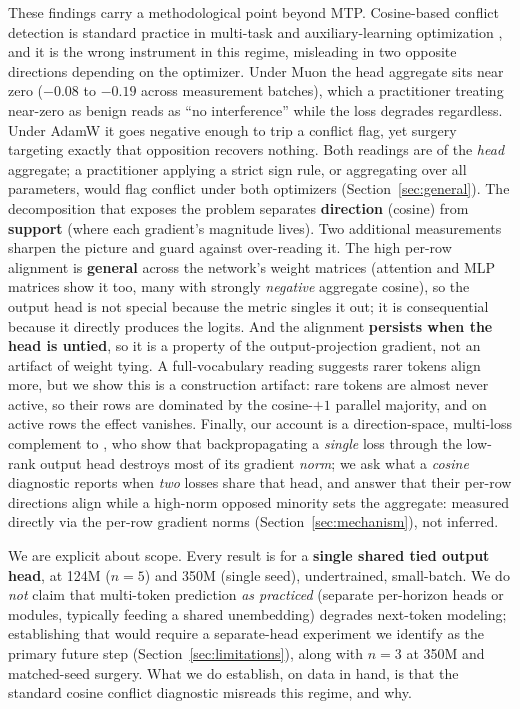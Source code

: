 These findings carry a methodological point beyond MTP. Cosine-based conflict
detection is standard practice in multi-task and auxiliary-learning optimization
\citep{yu2020pcgrad,wang2021gradvaccine,du2018auxsim}, and it is the wrong
instrument in this regime, misleading in two opposite directions depending on the
optimizer. Under Muon the head aggregate sits near zero (${-}0.08$ to ${-}0.19$
across measurement batches), which a practitioner treating near-zero as benign reads
as ``no interference'' while the loss degrades regardless. Under AdamW it goes
negative enough to trip a conflict flag, yet surgery targeting exactly that
opposition recovers nothing. Both readings are of the \emph{head} aggregate; a
practitioner applying a strict sign rule, or aggregating over all parameters, would
flag conflict under both optimizers (Section~\ref{sec:general}). The
decomposition that exposes the problem separates \textbf{direction} (cosine) from
\textbf{support} (where each gradient's magnitude lives). Two additional
measurements sharpen the picture and guard against over-reading it. The high
per-row alignment is \textbf{general} across the network's weight matrices (attention and MLP matrices show it too, many with strongly \emph{negative}
aggregate cosine), so the output head is not special because the metric singles
it out; it is consequential because it directly produces the logits. And the
alignment \textbf{persists when the head is untied}, so it is a property of the
output-projection gradient, not an artifact of weight tying. A full-vocabulary
reading suggests rarer tokens align more, but we show this is a construction
artifact: rare tokens are almost never active, so their rows are dominated by
the cosine-$+1$ parallel majority, and on active rows the effect vanishes. Finally,
our account is a direction-space, multi-loss
complement to \citet{godey2026lmhead}, who show that backpropagating a
\emph{single} loss through the low-rank output head destroys most of its gradient
\emph{norm}; we ask what a \emph{cosine} diagnostic reports when \emph{two} losses
share that head, and answer that their per-row directions align while a high-norm
opposed minority sets the aggregate: measured directly via the per-row gradient
norms (Section~\ref{sec:mechanism}), not inferred.

We are explicit about scope. Every result is for a \textbf{single shared tied
output head}, at 124M ($n{=}5$) and 350M (single seed), undertrained, small-batch.
We do \emph{not} claim that multi-token prediction \emph{as practiced} (separate per-horizon
heads or modules, typically feeding a shared unembedding) degrades next-token modeling; establishing that would require a
separate-head experiment we identify as the primary future step (Section~\ref{sec:limitations}), along with $n{=}3$ at 350M and matched-seed
surgery. What we do establish, on data in hand, is that the standard cosine
conflict diagnostic misreads this regime, and why.

